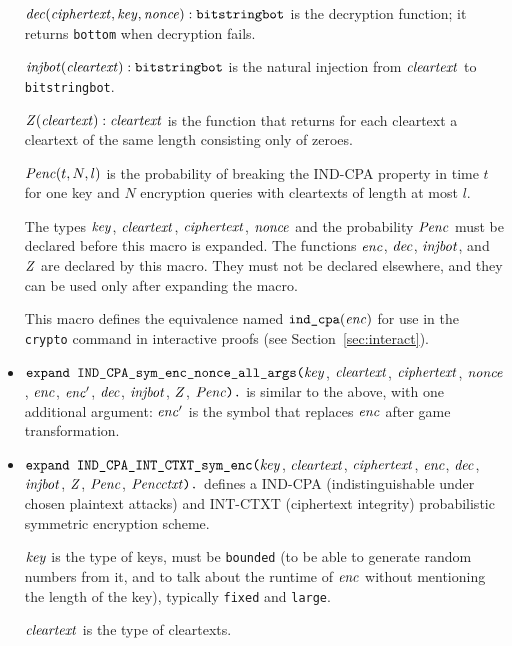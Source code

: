 \documentclass{article}
\begin{document}
\begin{itemize}
   $\mathit{dec}(\mathit{ciphertext}, \mathit{key}, \mathit{nonce}): \texttt{bitstringbot}$ is the
  decryption function; it returns \texttt{bottom} when decryption
  fails.

   $\mathit{injbot}(\mathit{cleartext}): \texttt{bitstringbot}$ is the natural
  injection from $\mathit{cleartext}$ to \texttt{bitstringbot}.

   $\mathit{Z}(\mathit{cleartext}): \mathit{cleartext}$ is the function that
  returns for each cleartext a cleartext of the same length consisting
  only of zeroes.

  $\mathit{Penc}(t, N, l)$ is the probability of breaking the IND-CPA
  property in time $t$ for one key and $N$ encryption queries with
  cleartexts of length at most $l$.

   The types $\mathit{key}$, $\mathit{cleartext}$,
   $\mathit{ciphertext}$, $\mathit{nonce}$ and the probability $\mathit{Penc}$ must
   be declared before this macro is expanded. The functions
   $\mathit{enc}$, $\mathit{dec}$, $\mathit{injbot}$, and $\mathit{Z}$ are declared by this
   macro. They must not be declared elsewhere, and they can be used
   only after expanding the macro.

   This macro defines the equivalence named $\texttt{ind\_cpa}(\mathit{enc})$
   for use in the \texttt{crypto} command in interactive proofs
   (see Section~\ref{sec:interact}).

\item $\texttt{expand IND\_CPA\_sym\_enc\_nonce\_all\_args(}\mathit{key}$,
  $\mathit{cleartext}$, $\mathit{ciphertext}$, $\mathit{nonce}$, $\mathit{enc}$, $\mathit{enc}'$,
  $\mathit{dec}$, $\mathit{injbot}$, $\mathit{Z}$, $\mathit{Penc}\texttt{).}$ is similar to the above,
  with one additional argument: $\mathit{enc}'$ is the symbol that replaces $\mathit{enc}$ after game transformation.

\item $\texttt{expand IND\_CPA\_INT\_CTXT\_sym\_enc(}\mathit{key}$,
  $\mathit{cleartext}$, $\mathit{ciphertext}$, $\mathit{enc}$,
  $\mathit{dec}$, $\mathit{injbot}$, $\mathit{Z}$, $\mathit{Penc}$, $\mathit{Pencctxt}\texttt{).}$ defines a
  IND-CPA (indistinguishable under chosen plaintext attacks) and INT-CTXT (ciphertext integrity)
  probabilistic symmetric encryption scheme.

   $\mathit{key}$ is the type of keys, must be \texttt{bounded} (to be able to generate random numbers from it, and to talk about the runtime of $\mathit{enc}$ without mentioning the length of the key), typically \texttt{fixed} and \texttt{large}.

   $\mathit{cleartext}$ is the type of cleartexts.


\end{itemize}
\end{document}
